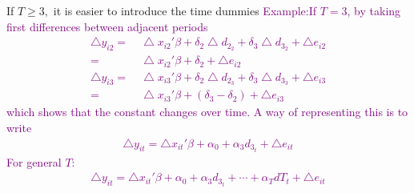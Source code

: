 \documentclass[a4paper,twoside,11pt]{article}
\begin{document}
\newline
\newline
If $T \ge 3,$ it is easier to introduce the time dummies 
\newline
\textcolor{Purple}{Example:If $T=3$, by taking first differences between adjacent periods
\begin{equation*}
\begin{aligned}
\bigtriangleup y_{i2} =& \  \bigtriangleup x_{i2}' \beta + \delta_2 \bigtriangleup d_{2_2} + \delta_3 \bigtriangleup d_{3_2} + \bigtriangleup e_{i2} \\ 
=& \ \bigtriangleup x_{i2}' \beta + \delta_2 + \bigtriangleup e_{i2}  \\
\bigtriangleup y_{i3} =& \ \bigtriangleup x_{i3}' \beta + \delta_2 \bigtriangleup d_{2_3} + \delta_3 \bigtriangleup d_{3_3} + \bigtriangleup e_{i3} \\
=& \ \bigtriangleup x_{i3}' \beta + (\delta_3 - \delta_2 ) + \bigtriangleup e_{i3}
\end{aligned}
\end{equation*}
which shows that the constant changes over time.
\newline
\newline
A way of representing this is to write
\begin{equation*}
\begin{aligned}
\bigtriangleup y_{it} = \bigtriangleup x_{it}' \beta + \alpha_0 + \alpha_3 d_{3_t} + \bigtriangleup e_{it}
\end{aligned}
\end{equation*}
For general $T$:
\begin{equation*}
\begin{aligned} 
\bigtriangleup y_{it} = \bigtriangleup x_{it}' \beta + \alpha_0 + \alpha_3 d_{3_t} + \cdots + \alpha_T dT_t + \bigtriangleup e_{it}
\end{aligned}
\end{equation*}
}
\end{document}
